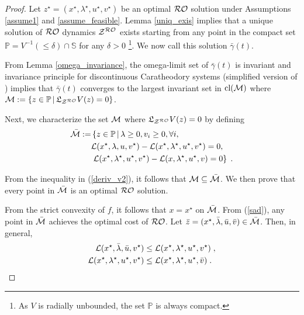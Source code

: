 \documentclass[journal,twoside,web]{ieeecolor}
\begin{document}
\begin{proof}
Let $z^\star=(x^\star,\lambda^\star,u^\star,v^\star)$ be an optimal ${\cal RO}$ solution under Assumptions \ref{assume1} and \ref{assume_feasible}. Lemma \ref{uniq_exis} implies that a unique solution of ${\cal RO}$ dynamics ${\cal Z}^{\cal RO}$ exists starting from any point in the compact set $\mathbb P=V^{-1}(\leq \delta) \cap \mathbb S$ for any $\delta>0$ \footnote{As $V$ is radially unbounded, the set $\mathbb P$ is always compact.}. We now call this solution $\bar \gamma(t)$.

From Lemma \ref{omega_invariance}, the omega-limit set of $\bar \gamma(t)$ is invariant and invariance principle for discontinuous Caratheodory systems \cite[Proposition~2.1]{cherukuri2016} (simplified version of \cite[Proposition~3]{bacciotti2006nonpathological}) implies that $\bar \gamma(t)$ converges to the largest invariant set in $\text{cl}({\cal M})$ where ${\cal M}:=\{z \in \mathbb P\,|\, \mathfrak{L}_{{\cal Z}^{\cal RO}}V(z)=0\}$.

Next, we characterize the set ${\cal M}$ where $\mathfrak{L}_{{\cal Z}^{\cal RO}}V(z)=0$ by defining
\begin{align}
\bar{\cal M}:=& \left\{z \in \mathbb P\,\middle|\,\lambda\geq 0, v_i\geq 0, \forall i, \right. \nonumber\\
&{\cal L}(x^\star,\lambda,u,v^\star)-{\cal L}(x^\star,\lambda^\star,u^\star,v^\star)=0, \nonumber\\
&\left. {\cal L}(x^\star,\lambda^\star,u^\star,v^\star)-{\cal L}(x,\lambda^\star,u^\star,v)=0 \right\}\;.\label{sad}
\end{align}

From the inequality in (\ref{deriv_v2}), it follows that ${\cal M} \subseteq \bar{\cal M}$. We then prove that every point in $\bar{\cal M}$ is an optimal ${\cal RO}$ solution.

From the strict convexity of $f$, it follows that $x=x^\star$ on $\bar{\cal M}$. From (\ref{sad}), any point in $\bar{\cal M}$ achieves the optimal cost of ${\cal RO}$. Let $\bar{z}=(x^\star,\bar{\lambda},\bar{u},\bar{v})\in \bar{\cal M}$\;. Then, in general,
\begin{align*}
    {\cal L}(x^\star,\bar{\lambda},\bar{u},v^\star) &\leq {\cal L}(x^\star,\lambda^\star,u^\star,v^\star)\;, \\
    {\cal L}(x^\star,\lambda^\star,u^\star,v^\star) &\leq {\cal L}(x^\star,\lambda^\star,u^\star,\bar{v})\;.
\end{align*}


\end{proof}
\end{document}
